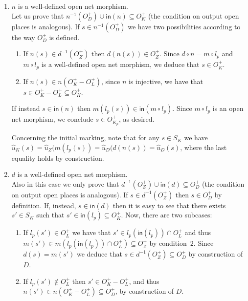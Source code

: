 \documentclass{LMCS}
\newcommand{\inp}[1]{\ensuremath{\mathsf{in}({#1})}}
\newcommand{\init}[1]{\hat{#1}}
\begin{document}
  \begin{enumerate}[({a}.1)]

  \item $n$ is a well-defined open net morphism.\\
    Let us prove that $n^{-1}(O_D^+) \cup \inp{n} \subseteq O_K^+$
    (the condition on  output open places is analogous).  If $s \in
    n^{-1}(O_D^+)$ we have two possibilities according to the way
    $O_D^+$ is defined.
    \begin{enumerate}[$-$]
    \item If $n(s) \in d^{-1}(O_Z^+)$ then $d(n(s)) \in O_Z^+$. Since $d \circ
    n = m \circ l_p$ and $m \circ l_p$ is a well-defined open net morphism, we
    deduce that $s \in O_K^+$.

    \item If $n(s) \in n(O_K^+ - O_L^+)$, since $n$ is injective, we have that
    $s \in O_K^+ - O_L^+ \subseteq O_K^+$.
    \end{enumerate}
    If instead $s \in \inp{n}$ then $m(l_p(s)) \in \inp{m \circ
    l_p}$. Since $m \circ l_p$ is an open net morphism, we conclude $s
    \in O_{K_p}^+$, as desired.

    Concerning the initial marking, note that for any $s \in S_K$ we
    have $\init{u}_K(s) = \init{u}_Z(m(l_p(s)) = \init{u}_D(d(n(s)) =
    \init{u}_D(s)$, where the last equality holds by construction.

    \medskip
    
  \item $d$ is a well-defined open net morphism.\\
    Also in this case we only prove that $d^{-1}(O_Z^+) \cup \inp{d}
    \subseteq O_D^+$ (the condition on  output open places is
    analogous). If $s \in d^{-1}(O_Z^+)$ then $s \in O_D^+$ by
    definition. If, instead, $s \in \inp{d}$ then it is easy to see
    that there exists $s' \in S_K$ such that $s' \in \inp{l_p}
    \subseteq O_K^+$. Now, there are two subcases:
    \begin{enumerate}[$-$]
      
    \item If $l_p(s') \in O_L^+$ we have that $s' \in l_p(\inp{l_p}) \cap O_L^+$ and
      thus $m(s') \in m(l_p(\inp{l_p}) \cap O_L^+) \subseteq O_Z^+$ by
      condition~2. Since $d(s) = m(s')$ we deduce that $s \in d^{-1}(O_Z^+)
      \subseteq O_D^+$ by construction of $D$.

    \item If $l_p(s') \not\in O_L^+$ then $s' \in O_K^+ - O_L^+$, and
      thus $n(s') \in n(O_K^+ - O_L^+) \subseteq O_D^+$, by construction of $D$.
      

\end{enumerate}
\end{enumerate}
\end{document}
